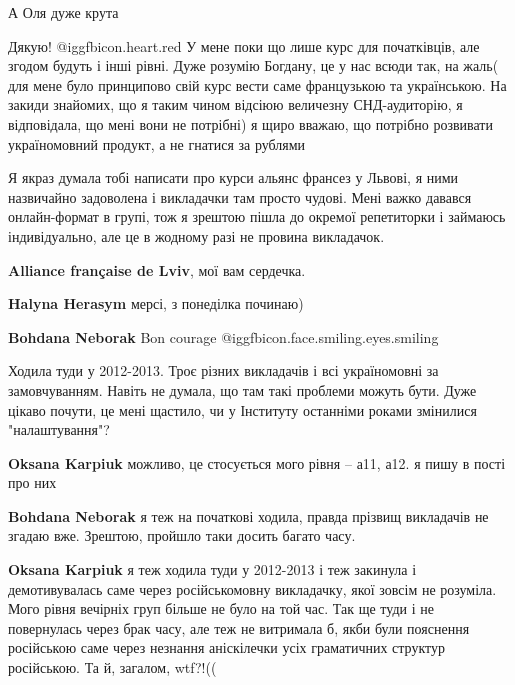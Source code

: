 \begin{itemize}
А Оля дуже крута

\begin{itemize} %
Дякую! @igg{fbicon.heart.red}
У мене поки що лише курс для початківців, але згодом будуть і інші рівні.
Дуже розумію Богдану, це у нас всюди так, на жаль( для мене було принципово свій курс вести саме французькою та українською. На закиди знайомих, що я таким чином відсіюю величезну СНД-аудиторію, я відповідала, що мені вони не потрібні) я щиро вважаю, що потрібно розвивати україномовний продукт, а не гнатися за рублями 
\end{itemize} %


Я якраз думала тобі написати про курси альянс франсез у Львові, я ними
назвичайно задоволена і викладачки там просто чудові. Мені важко давався
онлайн-формат в групі, тож я зрештою пішла до окремої репетиторки і займаюсь
індивідуально, але це в жодному разі не провина викладачок.

\textbf{Alliance française de Lviv}, мої вам сердечка.

\begin{itemize} %
\textbf{Halyna Herasym} мерсі, з понеділка починаю)

\textbf{Bohdana Neborak} Bon courage  @igg{fbicon.face.smiling.eyes.smiling} 
\end{itemize} %


Ходила туди у 2012-2013. Троє різних викладачів і всі україномовні за
замовчуванням. Навіть не думала, що там такі проблеми можуть бути. Дуже цікаво
почути, це мені щастило, чи у Інституту останніми роками змінилися
"налаштування"?

\begin{itemize} %
\textbf{Oksana Karpiuk} можливо, це стосується мого рівня – а11, а12. я пишу в пості про них

\textbf{Bohdana Neborak} я теж на початкові ходила, правда прізвищ викладачів не згадаю вже. Зрештою, пройшло таки досить багато часу.

\textbf{Oksana Karpiuk} я теж ходила туди у 2012-2013 і теж закинула і демотивувалась саме через російськомовну викладачку, якої зовсім не розуміла. Мого рівня вечірніх груп більше не було на той час. Так ще туди і не повернулась через брак часу, але теж не витримала б, якби були пояснення російською саме через незнання аніскілечки усіх граматичних структур російською. Та й, загалом, wtf?!((


\end{itemize}
\end{itemize}
